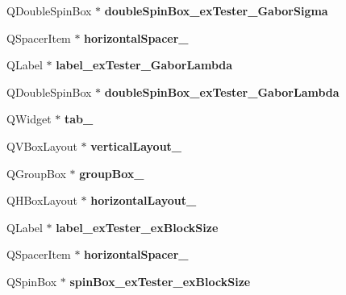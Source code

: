 \begin{DoxyCompactItemize}
Q\+Double\+Spin\+Box $\ast$ {\bfseries double\+Spin\+Box\+\_\+ex\+Tester\+\_\+\+Gabor\+Sigma}
\item 
\mbox{\label{class_ui___main_window_a90dabda691011afb194823ac0c52d694}} 
Q\+Spacer\+Item $\ast$ {\bfseries horizontal\+Spacer\+\_}
\item 
\mbox{\label{class_ui___main_window_a1ec4a4843beb3dbd365ce57844ead760}} 
Q\+Label $\ast$ {\bfseries label\+\_\+ex\+Tester\+\_\+\+Gabor\+Lambda}
\item 
\mbox{\label{class_ui___main_window_af78dedd0cfcee212c8052961375b2078}} 
Q\+Double\+Spin\+Box $\ast$ {\bfseries double\+Spin\+Box\+\_\+ex\+Tester\+\_\+\+Gabor\+Lambda}
\item 
\mbox{\label{class_ui___main_window_ade7c1b9f7cb71a865cc304772c36278f}} 
Q\+Widget $\ast$ {\bfseries tab\+\_}
\item 
\mbox{\label{class_ui___main_window_af9fa970d5c9d23ee313ce5a172062989}} 
Q\+V\+Box\+Layout $\ast$ {\bfseries vertical\+Layout\+\_}
\item 
\mbox{\label{class_ui___main_window_abb28acde35ffce4d0e6152579df2cbc3}} 
Q\+Group\+Box $\ast$ {\bfseries group\+Box\+\_}
\item 
\mbox{\label{class_ui___main_window_ae3cff573138c6354cf8d4a0ced9ba71e}} 
Q\+H\+Box\+Layout $\ast$ {\bfseries horizontal\+Layout\+\_}
\item 
\mbox{\label{class_ui___main_window_a2b369b8e208d98b153842c871cbbe933}} 
Q\+Label $\ast$ {\bfseries label\+\_\+ex\+Tester\+\_\+ex\+Block\+Size}
\item 
\mbox{\label{class_ui___main_window_a520ac4176ab47577f158006d2dde0ab8}} 
Q\+Spacer\+Item $\ast$ {\bfseries horizontal\+Spacer\+\_}
\item 
\mbox{\label{class_ui___main_window_a991b99e6dfe34c65f627a2b2147d4053}} 
Q\+Spin\+Box $\ast$ {\bfseries spin\+Box\+\_\+ex\+Tester\+\_\+ex\+Block\+Size}

\end{DoxyCompactItemize}
